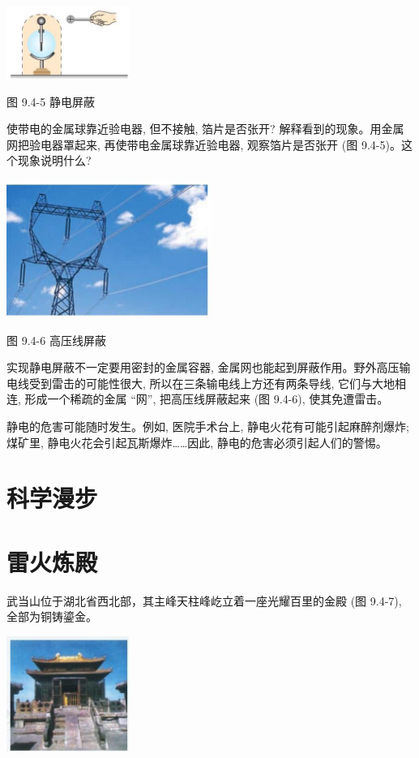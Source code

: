 \documentclass[10pt]{article}
\begin{document}
\begin{center}
\includegraphics[max width=0.3\textwidth]{images/01911d5f-8e38-70c0-b5b8-2b399bd115b6_25_509862.jpg}
\end{center}

图 9.4-5 静电屏蔽

使带电的金属球靠近验电器, 但不接触, 箔片是否张开? 解释看到的现象。用金属网把验电器罩起来, 再使带电金属球靠近验电器, 观察箔片是否张开 (图 9.4-5)。这个现象说明什么?

\begin{center}
\includegraphics[max width=0.5\textwidth]{images/01911d5f-8e38-70c0-b5b8-2b399bd115b6_25_835622.jpg}
\end{center}

图 9.4-6 高压线屏蔽

实现静电屏蔽不一定要用密封的金属容器, 金属网也能起到屏蔽作用。野外高压输电线受到雷击的可能性很大, 所以在三条输电线上方还有两条导线, 它们与大地相连, 形成一个稀疏的金属 “网”, 把高压线屏蔽起来 (图 9.4-6), 使其免遭雷击。

静电的危害可能随时发生。例如, 医院手术台上, 静电火花有可能引起麻醉剂爆炸; 煤矿里, 静电火花会引起瓦斯爆炸……因此, 静电的危害必须引起人们的警惕。

\section*{科学漫步}

\section*{雷火炼殿}

武当山位于湖北省西北部，其主峰天柱峰屹立着一座光耀百里的金殿 (图 9.4-7), 全部为铜铸鎏金。

\begin{center}
\includegraphics[max width=0.3\textwidth]{images/01911d5f-8e38-70c0-b5b8-2b399bd115b6_25_137729.jpg}
\end{center}
\end{document}
